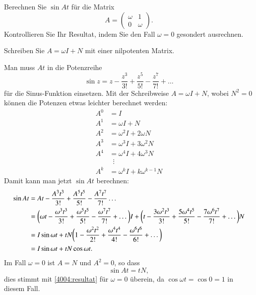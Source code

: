 Berechnen Sie $\sin At$ für die Matrix
\[
A=\begin{pmatrix}
\omega& 1 \\
 0 &\omega
\end{pmatrix}.
\]
Kontrollieren Sie Ihr Resultat, indem Sie den Fall $\omega = 0$ gesondert
ausrechnen.
\begin{hinweis}
Schreiben Sie $A=\omega I + N$ mit einer nilpotenten Matrix.
\end{hinweis}

\begin{loesung}
Man muss $At$ in die Potenzreihe
\[
\sin z = z - \frac{z^3}{3!} + \frac{z^5}{5!} - \frac{z^7}{7!} + \dots
\]
für die Sinus-Funktion einsetzen.
Mit der Schreibweise $A=\omega I + N$, wobei $N^2=0$ können die Potenzen etwas
leichter berechnet werden:
\begin{align*}
A^0 &= I
\\
A^1 &= \omega I + N
\\
A^2 &= \omega^2 I + 2\omega N
\\
A^3 &= \omega^3 I + 3\omega^2 N
\\
A^4 &= \omega^4 I + 4\omega^3 N
\\
&\phantom{a}\vdots
\\
A^k &= \omega^k I + k\omega^{k-1} N
\end{align*}
Damit kann man jetzt $\sin At$ berechnen:
\begin{align}
\sin At
&=
At - \frac{A^3t^3}{3!}  + \frac{A^5t^5}{5!} - \frac{A^7t^7}{7!}
\dots
\notag
\\
&=
\biggl(
\omega t  - \frac{\omega^3t^3}{3!} + \frac{\omega^5t^5}{5!} - \frac{\omega^7t^7}{7!}
+\dots
\biggr)I
+
\biggl(
t -\frac{3\omega^2t^3}{3!} + \frac{5\omega^4t^5}{5!} - \frac{7\omega^6t^7}{7!}+\dots
\biggr)N
\notag
\\
&=
I\sin\omega t
+tN\biggl(1-\frac{\omega^2t^2}{2!} +\frac{\omega^4t^4}{4!}
- \frac{\omega^6t^6}{6!}
+\dots\biggr)
\notag
\\
&=I\sin\omega t + tN\cos\omega t.
\label{4004:resultat}
\end{align}
Im Fall $\omega=0$ ist $A=N$ und $A^2=0$, so dass
\[
\sin At = tN,
\]
dies stimmt mit \eqref{4004:resultat} für $\omega=0$ überein, da
$\cos\omega t = \cos 0=1$ in diesem Fall.
\end{loesung}
